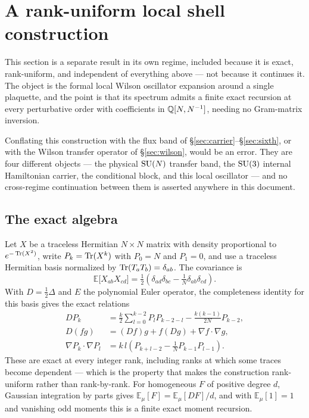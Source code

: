 \section{A rank-uniform local shell construction}
\label{sec:wick}

This section is a separate result in its own regime, included because it
is exact, rank-uniform, and independent of everything above --- not
because it continues it. The object is the formal local Wilson
oscillator expansion around a single plaquette, and the point is that
its spectrum admits a finite exact recursion at every perturbative
order with coefficients in $\mathbb{Q}[N, N^{-1}]$, needing no Gram-matrix
inversion.

Conflating this construction with the flux band of
\S\ref{sec:carrier}--\S\ref{sec:sixth}, or with the Wilson transfer
operator of \S\ref{sec:wilson}, would be an error. They are four
different objects --- the physical $\mathrm{SU}(N)$ transfer band, the $\mathrm{SU}(3)$
internal Hamiltonian carrier, the conditional block, and this local
oscillator --- and no cross-regime continuation between them is
asserted anywhere in this document.

\subsection{The exact algebra}

Let $X$ be a traceless Hermitian $N \times N$ matrix with density
proportional to $e^{-\operatorname{Tr}(X^2)}$, write $P_k = \operatorname{Tr}(X^k)$ with $P_0 = N$
and $P_1 = 0$, and use a traceless Hermitian basis normalized by
$\operatorname{Tr}(T_a T_b) = \delta_{ab}$. The covariance is
\begin{equation}
  \mathbb{E}\big[X_{ab} X_{cd}\big]
  = \tfrac12\left(\delta_{ad}\delta_{bc}
    - \tfrac{1}{N}\delta_{ab}\delta_{cd}\right).
\end{equation}
With $D = \tfrac12\Delta$ and $E$ the polynomial Euler operator, the
completeness identity for this basis gives the exact relations
\begin{align}
  D P_k &= \frac{k}{2}\sum_{l=0}^{k-2} P_l P_{k-2-l}
           - \frac{k(k-1)}{2N} P_{k-2},
  \\
  D(fg) &= (Df)g + f(Dg) + \nabla f \cdot \nabla g,
  \\
  \nabla P_k \cdot \nabla P_l
        &= k\,l\left(P_{k+l-2} - \frac{1}{N} P_{k-1}P_{l-1}\right).
\end{align}
These are exact at every integer rank, including ranks at which some
traces become dependent --- which is the property that makes the
construction rank-uniform rather than rank-by-rank. For homogeneous $F$
of positive degree $d$, Gaussian integration by parts gives
$\mathbb{E}_\mu[F] = \mathbb{E}_\mu[DF]/d$, and with
$\mathbb{E}_\mu[1] = 1$ and vanishing odd moments this is a finite exact
moment recursion.

